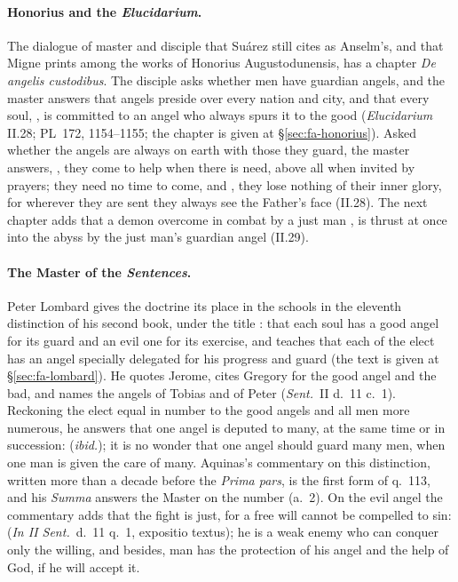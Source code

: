 \paragraph{Honorius and the \emph{Elucidarium}.} The dialogue of master and
disciple that Suárez still cites as Anselm's, and that Migne prints among the
works of Honorius Augustodunensis, has a chapter \emph{De angelis
custodibus}. The
disciple asks whether men have guardian angels, and the master answers that
angels preside over every nation and city, and that every soul, , is committed to an angel who always spurs it to the
good (\emph{Elucidarium} II.28; PL~172, 1154--1155; the chapter is given at
\S\ref{sec:fa-honorius}). Asked
whether the angels
are always on earth with those they guard, the master answers,
, they come to help when there is need, above all when invited by
prayers; they need no time to come, and , they
lose nothing of their inner glory, for wherever they are sent they always see
the Father's face (II.28). The next chapter adds that a demon overcome in
combat by a just man , is thrust at once into the abyss by the just man's guardian
angel (II.29).

\paragraph{The Master of the \emph{Sentences}.} Peter Lombard gives the
doctrine its place in the schools in the eleventh distinction of his second
book, under the title : that each soul has a good angel for its
guard and an evil one for its exercise, and teaches that each of the elect
has an angel specially delegated for his progress and guard (the text is
given at \S\ref{sec:fa-lombard}). He quotes
Jerome, cites Gregory for the good angel and the bad, and names the angels of
Tobias and of Peter (\emph{Sent.}\ II d.~11 c.~1). Reckoning the elect equal
in number to the good angels and all men more numerous, he answers that one
angel is deputed to many, at the same time or in succession:
 (\emph{ibid.}); it is no wonder
that one angel should guard many men, when one man is given the care of
many. Aquinas's commentary on this distinction, written more than a decade
before the \emph{Prima pars}, is the first form of q.~113, and his
\emph{Summa} answers the Master on the number (a.~2). On the evil angel
 the commentary adds that the fight is just, for a free will
cannot be compelled to sin:  (\emph{In II Sent.}\ d.~11 q.~1, expositio
textus); he is a weak enemy who can conquer only the willing, and besides,
man has the protection of his angel and the help of God, if he will accept
it.

